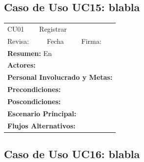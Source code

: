 \subsection{Caso de Uso UC15: blabla}

\begin{longtable}{|l|p{5.5cm}|l|p{2cm}|l|p{1.9cm}|} \hline
    \cellcolor{grisOscuro} CU01 & \multicolumn{4}{|l|}{  \cellcolor{grisOscuro} Registrar} &  \cellcolor{grisClaro}\multirow{2}{1cm}{} \\ \cline{1-5}
    \cellcolor{grisOscuro} Revisa: &  \cellcolor{grisClaro} &  \cellcolor{grisOscuro} Fecha &  \cellcolor{grisClaro} &  \cellcolor{grisOscuro} Firma: & \cellcolor{grisClaro} \\ \hline
    \multicolumn{6}{|p{15cm}|}{ \textbf{Resumen: } En

    } \\ \hline

    \multicolumn{6}{|p{15cm}|}{ \textbf{Actores: }

    } \\ \hline

    \multicolumn{6}{|p{15cm}|}{ \textbf{Personal Involucrado y Metas: }

    } \\ \hline

    \multicolumn{6}{|p{15cm}|}{ \textbf{Precondiciones: }

    } \\ \hline

    \multicolumn{6}{|p{15cm}|}{ \textbf{Poscondiciones: }

    } \\ \hline

    \multicolumn{6}{|p{15cm}|}{ \textbf{Escenario Principal: }

    } \\ \hline

    \multicolumn{6}{|p{15cm}|}{ \textbf{Flujos Alternativos: }

    } \\ \hline

\end{longtable}


\subsection{Caso de Uso UC16: blabla}

